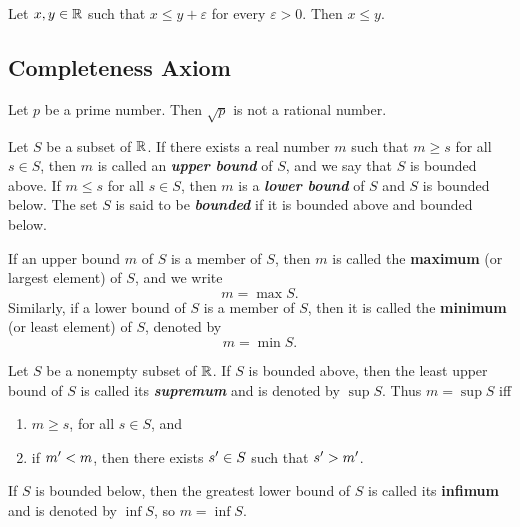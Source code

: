\documentclass[12pt]{article}
\begin{document}
\begin{theorem}
  Let $x, y \in \mathbb{R}$ such that $x \le y + \varepsilon$ for every $\varepsilon > 0$. Then $x \le y$.
\end{theorem}

\subsection{Completeness Axiom}
\label{sec:org46c618d}
\begin{definition}[Irrational]
  Let $p$ be a prime number. Then $\sqrt{p}$ is not a rational number.
\end{definition}

\begin{definition}[Bounds]
  Let $S$ be a subset of $\mathbb{R}$. If  there exists a real number $m$ such that
  $m \ge s$ for all $s \in S$, then $m$ is called an \textit{\textbf{upper bound}}
  of $S$, and  we say that $S$ is bounded  above. If $m \le s$ for  all $s \in S$,
  then $m$ is a \textit{\textbf{lower bound}} of $S$ and $S$ is bounded below.
  The set $S$  is said to be \textit{\textbf{bounded}} if  it is bounded above
  and bounded below.
\end{definition}

\begin{definition}
  If an  upper bound $m$  of $S$ is  a member of $S$,  then $m$ is  called the
  \textbf{maximum} (or largest  element) of $S$, and we write  $$m = \max S.$$
  Similarly, if a lower bound of $S$ is a member of $S$, then it is called the
  \textbf{minimum} (or least element) of $S$, denoted by $$m = \min S.$$
\end{definition}

\begin{definition}
  Let $S$ be a  nonempty subset of $\mathbb{R}$. If $S$ is  bounded above, then the
  least upper  bound of  $S$ is called  its \textit{\textbf{supremum}}  and is
  denoted by $\sup S$. Thus $m = \sup S$ iff

  \begin{enumerate}
    \item $m \ge s$, for all $s \in S$, and 
    \item if $m' < m$, then there exists $s' \in S$ such that $s' > m'$.
  \end{enumerate}

  If $S$ is bounded below, then the  greatest lower bound of $S$ is called its
  \textbf{infimum} and is denoted by $\inf S$, so $m = \inf S$.

\end{definition}
\end{document}

